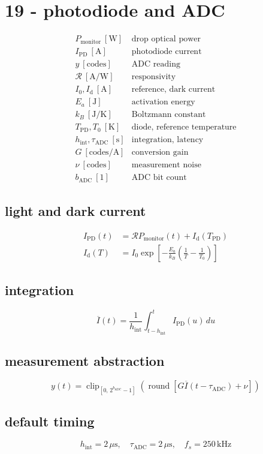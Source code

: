 \section*{19 - photodiode and ADC}

\[
\begin{array}{ll}P_{\mathrm{monitor}}\ [\mathrm W]&\text{drop optical power}\\[0.6em]I_{\mathrm{PD}}\ [\mathrm A]&\text{photodiode current}\\[0.6em]y\ [\mathrm{codes}]&\text{ADC reading}\\[0.6em]\mathcal R\ [\mathrm{A/W}]&\text{responsivity}\\[0.6em]I_0,I_{\mathrm d}\ [\mathrm A]&\text{reference, dark current}\\[0.6em]E_a\ [\mathrm J]&\text{activation energy}\\[0.6em]k_B\ [\mathrm{J/K}]&\text{Boltzmann constant}\\[0.6em]T_{\mathrm{PD}},T_0\ [\mathrm K]&\text{diode, reference temperature}\\[0.6em]h_{\mathrm{int}},\tau_{\mathrm{ADC}}\ [\mathrm s]&\text{integration, latency}\\[0.6em]G\ [\mathrm{codes/A}]&\text{conversion gain}\\[0.6em]\nu\ [\mathrm{codes}]&\text{measurement noise}\\[0.6em]b_{\mathrm{ADC}}\ [1]&\text{ADC bit count}\end{array}
\]

\subsection*{light and dark current}
\[
\displaystyle \begin{aligned}I_{\mathrm{PD}}(t)&=\mathcal R P_{\mathrm{monitor}}(t)+I_{\mathrm d}(T_{\mathrm{PD}})\\I_{\mathrm d}(T)&=I_0\exp\!\left[-\frac{E_a}{k_B}\left(\frac1T-\frac1{T_0}\right)\right]\end{aligned}
\]

\subsection*{integration}
\[
\displaystyle \overline I(t)=\frac1{h_{\mathrm{int}}}\int_{t-h_{\mathrm{int}}}^{t}I_{\mathrm{PD}}(u)\,du
\]

\subsection*{measurement abstraction}
\[
\displaystyle y(t)=\operatorname{clip}_{[0,\,2^{b_{\mathrm{ADC}}}-1]}\!\left(\operatorname{round}\!\left[G\overline I(t-\tau_{\mathrm{ADC}})+\nu\right]\right)
\]

\subsection*{default timing}
\[
\displaystyle h_{\mathrm{int}}=2\,\mu\mathrm s,\quad\tau_{\mathrm{ADC}}=2\,\mu\mathrm s,\quad f_s=250\,\mathrm{kHz}
\]
